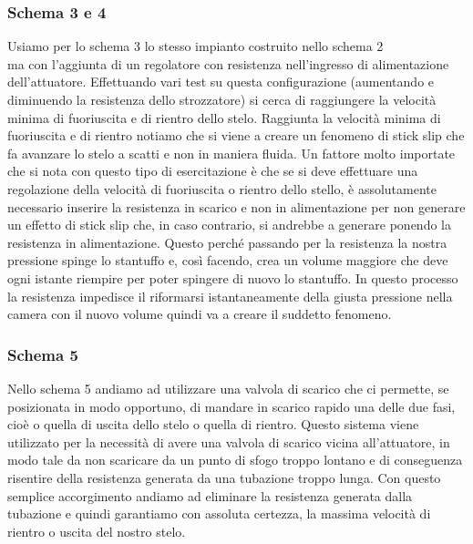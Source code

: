 \documentclass[a4paper]{article}
\begin{document}
\subsubsection{Schema 3 e 4}
Usiamo per lo schema 3 lo stesso impianto costruito nello schema 2 \\
ma con l’aggiunta di un regolatore con resistenza nell’ingresso di alimentazione dell’attuatore.
Effettuando vari test su questa configurazione (aumentando e diminuendo la resistenza dello strozzatore) si cerca di raggiungere la velocità minima di fuoriuscita e di rientro dello stelo.
Raggiunta la velocità minima di fuoriuscita e di rientro notiamo che si viene a creare un fenomeno di stick slip che fa avanzare lo stelo a scatti e non in maniera fluida.
Un fattore molto importate che si nota con questo tipo di esercitazione è che se si deve effettuare una regolazione della velocità di fuoriuscita o rientro dello stello, è assolutamente necessario inserire la resistenza in scarico e non in alimentazione per non generare un effetto di stick slip che, in caso contrario, si andrebbe a generare ponendo la resistenza in alimentazione. Questo perché passando per la resistenza la nostra pressione spinge lo stantuffo e, così facendo, crea un volume maggiore che deve ogni istante riempire per poter spingere di nuovo lo stantuffo. In questo processo la resistenza impedisce il riformarsi istantaneamente della giusta pressione nella camera con il nuovo volume quindi va a creare il suddetto fenomeno.

\subsubsection{Schema 5}
Nello schema 5 andiamo ad utilizzare una valvola di scarico che ci permette, se posizionata in modo opportuno, di mandare in scarico rapido una delle due fasi, cioè o quella di uscita dello stelo o quella di rientro.
Questo sistema viene utilizzato per la necessità di avere una valvola di scarico vicina all’attuatore, in modo tale da non scaricare da un punto di sfogo troppo lontano e di conseguenza risentire della resistenza generata da una tubazione troppo lunga. Con questo semplice accorgimento andiamo ad eliminare la resistenza generata dalla tubazione e quindi garantiamo con assoluta certezza, la massima velocità di rientro o uscita del nostro stelo.
\end{document}
